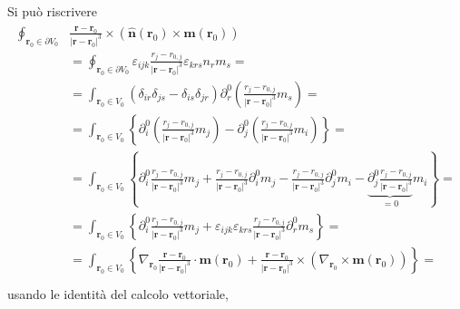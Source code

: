 \documentclass[letterpaper,10pt,italian]{jupyterBook}
\begin{document}
\sphinxAtStartPar
Si può riscrivere
\begin{equation*}
\begin{split}\begin{aligned}
  \oint_{\mathbf{r}_0 \in \partial V_0} & \frac{\mathbf{r} - \mathbf{r}_0}{|\mathbf{r} - \mathbf{r}_0|^3} \times \left( \hat{\mathbf{n}}(\mathbf{r}_0) \times \mathbf{m}(\mathbf{r}_0) \right) \\
  & = \oint_{\mathbf{r}_0 \in \partial V_0} \varepsilon_{ijk} \frac{r_j - r_{0,j}}{|\mathbf{r}-\mathbf{r}_0|^3} \varepsilon_{krs} n_r m_s = \\
  & = \int_{\mathbf{r}_0 \in V_0} \left( \delta_{ir} \delta_{js} - \delta_{is} \delta_{jr} \right) \partial^0_r \left( \frac{r_j - r_{0,j}}{|\mathbf{r}-\mathbf{r}_0|^3} m_s \right) = \\
  & = \int_{\mathbf{r}_0 \in V_0} \left\{ \partial^0_i \left( \frac{r_j - r_{0,j}}{|\mathbf{r}-\mathbf{r}_0|^3} m_j \right) - \partial^0_j \left( \frac{r_j - r_{0,j}}{|\mathbf{r}-\mathbf{r}_0|^3} m_i \right)  \right\} = \\
  & = \int_{\mathbf{r}_0 \in V_0}
  \left\{ \partial^0_i \frac{r_j - r_{0,j}}{|\mathbf{r}-\mathbf{r}_0|^3} m_j 
         + \frac{r_j - r_{0,j}}{|\mathbf{r}-\mathbf{r}_0|^3} \partial^0_i m_j
         - \frac{r_j - r_{0,j}}{|\mathbf{r}-\mathbf{r}_0|^3} \partial^0_j m_i 
         - \underbrace{ \partial^0_j \frac{r_j - r_{0,j}}{|\mathbf{r}-\mathbf{r}_0|^3}}_{=0} m_i 
  \right\} = \\
  & = \int_{\mathbf{r}_0 \in V_0}
  \left\{ \partial^0_i \frac{r_j - r_{0,j}}{|\mathbf{r}-\mathbf{r}_0|^3} m_j 
         + \varepsilon_{ijk} \varepsilon_{krs} \frac{r_j - r_{0,j}}{|\mathbf{r}-\mathbf{r}_0|^3} \partial^0_r m_s
  \right\} = \\
  & = \int_{\mathbf{r}_0 \in V_0}
  \left\{ \nabla_{\mathbf{r}_0} \frac{\mathbf{r} - \mathbf{r}_0}{|\mathbf{r}-\mathbf{r}_0|^3} \cdot \mathbf{m}(\mathbf{r}_0) 
         + \frac{\mathbf{r} - \mathbf{r}_0}{|\mathbf{r}-\mathbf{r}_0|^3} \times \left( \nabla_{\mathbf{r}_0} \times \mathbf{m}(\mathbf{r}_0) \right)
  \right\} = \\
\end{aligned}\end{split}
\end{equation*}
\sphinxAtStartPar
usando le identità del calcolo vettoriale,
\end{document}
